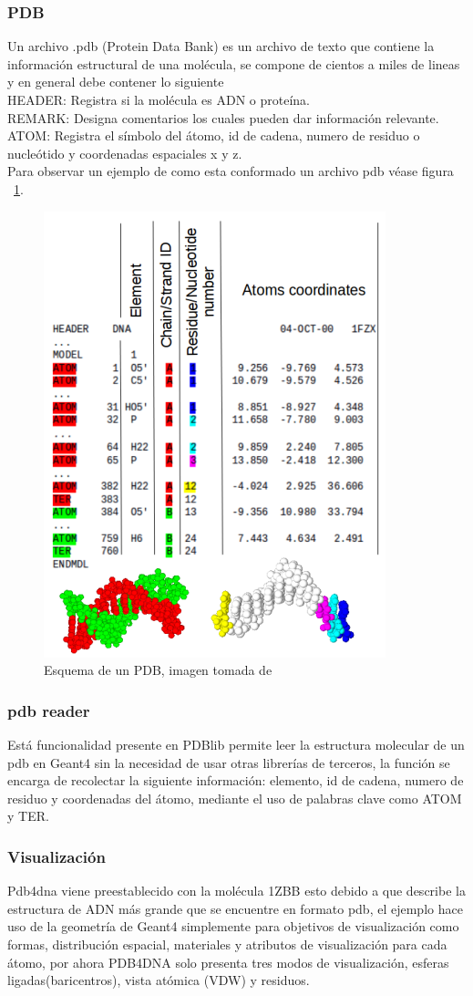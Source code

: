 \subsubsection{PDB}
Un archivo .pdb (Protein Data Bank) es un archivo de texto que contiene la información estructural de una molécula, se compone de cientos a miles de lineas y en general debe contener lo siguiente\\
HEADER: Registra si la molécula es ADN o proteína.\\
REMARK: Designa comentarios los cuales pueden dar información relevante.\\
ATOM: Registra el símbolo del átomo, id de cadena, numero de residuo o nucleótido y coordenadas espaciales x y z. \\
Para observar un ejemplo de como esta conformado un archivo pdb véase figura ~\ref{fig:pdbesq}.
\begin{figure}[htbp]
    \centering
    \includegraphics[width=.5\linewidth]{./Figures/pdb.png}
    \caption[Esquema de un PDB]{Esquema de un PDB, imagen tomada de\cite{pdblib}} %
    \label{fig:pdbesq}
\end{figure}

\subsubsection{pdb reader}
Está funcionalidad presente en PDBlib permite leer la estructura molecular de un pdb en Geant4 sin la necesidad de usar otras librerías de terceros, la función se encarga de recolectar la siguiente información: elemento, id de cadena, numero de residuo y coordenadas del átomo, mediante el uso de palabras clave como ATOM y TER\cite{pdblib}.
\subsubsection{Visualización}
Pdb4dna viene preestablecido con la molécula 1ZBB esto debido a que describe la estructura de ADN más grande que se encuentre en formato pdb, el ejemplo hace uso de la geometría de Geant4 simplemente para objetivos de visualización como formas, distribución espacial, materiales y atributos de visualización para cada átomo, por ahora PDB4DNA solo presenta tres modos de visualización, esferas ligadas(baricentros), vista atómica (VDW) y residuos\cite{pdblib}.


